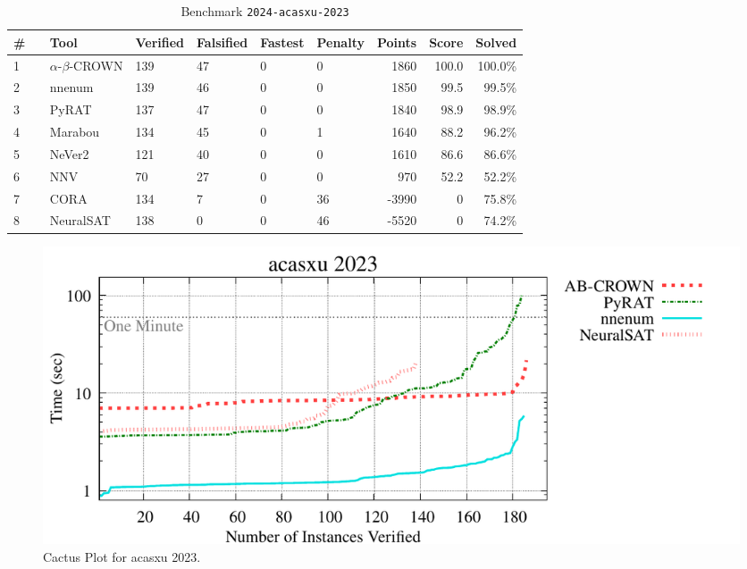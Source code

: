
\clearpage

\begin{table}[h]
\begin{center}
\caption{Benchmark \texttt{2024-acasxu-2023}} \label{tab:cat_{cat}}
{\setlength{\tabcolsep}{2pt}
\begin{tabular}[h]{@{}llllllrrr@{}}
\toprule
\textbf{\# ~} & \textbf{Tool} & \textbf{Verified} & \textbf{Falsified} & \textbf{Fastest} & \textbf{Penalty} & \textbf{Points} & \textbf{Score} & \textbf{Solved}\\
\midrule
1 & $\alpha$-$\beta$-CROWN & 139 & 47 & 0 & 0 & 1860 & 100.0 & 100.0\% \\
2 & nnenum & 139 & 46 & 0 & 0 & 1850 & 99.5 & 99.5\% \\
3 & PyRAT & 137 & 47 & 0 & 0 & 1840 & 98.9 & 98.9\% \\
4 & Marabou & 134 & 45 & 0 & 1 & 1640 & 88.2 & 96.2\% \\
5 & NeVer2 & 121 & 40 & 0 & 0 & 1610 & 86.6 & 86.6\% \\
6 & NNV & 70 & 27 & 0 & 0 & 970 & 52.2 & 52.2\% \\
7 & CORA & 134 & 7 & 0 & 36 & -3990 & 0 & 75.8\% \\
8 & NeuralSAT & 138 & 0 & 0 & 46 & -5520 & 0 & 74.2\% \\
\bottomrule
\end{tabular}
}
\end{center}
\end{table}



\begin{figure}[h]
\centerline{\includegraphics[width=\textwidth]{cactus/2024_acasxu_2023.pdf}}
\caption{Cactus Plot for acasxu 2023.}
\label{fig:quantPic}
\end{figure}


\clearpage

